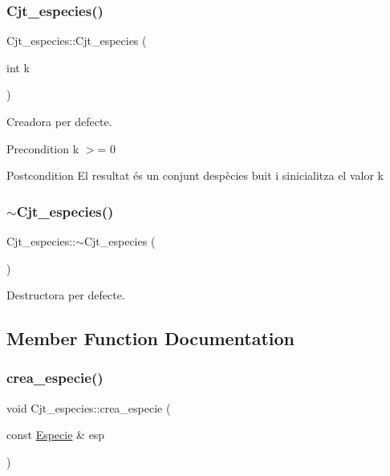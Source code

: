\subsubsection{\texorpdfstring{Cjt\+\_\+especies()}{Cjt\_especies()}}
{\footnotesize\ttfamily Cjt\+\_\+especies\+::\+Cjt\+\_\+especies (\begin{DoxyParamCaption}\item[{int}]{k }\end{DoxyParamCaption})}



Creadora per defecte. 

\begin{DoxyPrecond}{Precondition}
k $>$= 0 
\end{DoxyPrecond}
\begin{DoxyPostcond}{Postcondition}
El resultat és un conjunt d\textquotesingle{}espècies buit i s\textquotesingle{}inicialitza el valor k 
\end{DoxyPostcond}
\mbox{\label{class_cjt__especies_a05182978f6fff11a0fa1cec49514dd5e}} 
\subsubsection{\texorpdfstring{$\sim$\+Cjt\+\_\+especies()}{~Cjt\_especies()}}
{\footnotesize\ttfamily Cjt\+\_\+especies\+::$\sim$\+Cjt\+\_\+especies (\begin{DoxyParamCaption}{ }\end{DoxyParamCaption})}



Destructora per defecte. 



\subsection{Member Function Documentation}
\mbox{\label{class_cjt__especies_aa670b5a7cbd3df7ffababe566db93e13}} 
\subsubsection{\texorpdfstring{crea\+\_\+especie()}{crea\_especie()}}
{\footnotesize\ttfamily void Cjt\+\_\+especies\+::crea\+\_\+especie (\begin{DoxyParamCaption}\item[{const \hyperlink{class_especie}{Especie} \&}]{esp }\end{DoxyParamCaption})}



